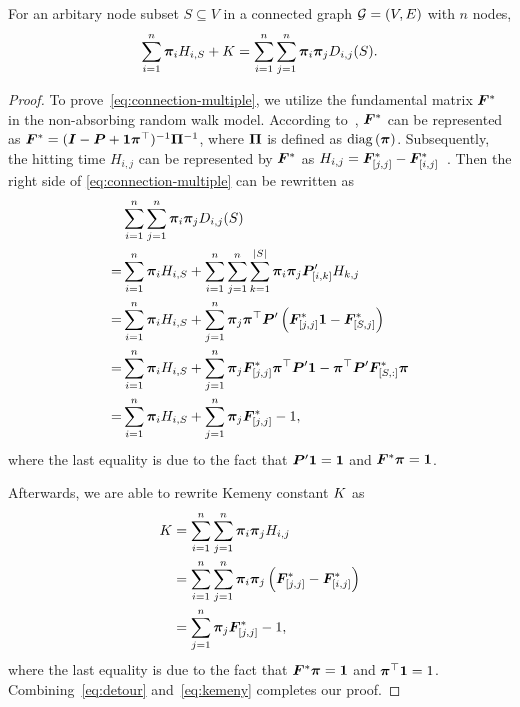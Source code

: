 \documentclass[sigconf]{acmart}
\begin{document}
\begin{theorem}\label{thm:connection-multiple}
    For an arbitary node subset \(S\subseteq V\) in a connected graph \(\mathcal{G}=(V,E)\) with \(n\) nodes,
    \begin{equation}\label{eq:connection-multiple}
        \sum_{i=1}^n\boldsymbol{\pi}_iH_{i,S}+K=\sum_{i=1}^n\sum_{j=1}^n\boldsymbol{\pi}_i\boldsymbol{\pi}_jD_{i,j}(S).
    \end{equation}
\end{theorem}
\begin{proof}
    To prove~\eqref{eq:connection-multiple}, we utilize the fundamental matrix \(\boldsymbol{F}^*\) in the non-absorbing random walk model.
    According to~\cite{BoRaZh11}, \(\boldsymbol{F}^*\) can be represented as \(\boldsymbol{F}^*=(\boldsymbol{I}-\boldsymbol{P}+\boldsymbol{1}\boldsymbol{\pi}^\top)^{-1}\boldsymbol{\Pi}^{-1}\), where \(\boldsymbol{\Pi}\) is defined as \(\rm{diag}\left( \boldsymbol{\pi} \right)\).
    Subsequently, the hitting time \(H_{i,j}\) can be represented by \(\boldsymbol{F}^*\) as \(H_{i,j}=\boldsymbol{F}^*_{[j,j]}-\boldsymbol{F}^*_{[i,j]}\)~\cite{BoRaZh11}.
    Then the right side of \eqref{eq:connection-multiple} can be rewritten as
    \begin{equation}\label{eq:detour}
        \begin{split}
            &\sum_{i=1}^n\sum_{j=1}^n\boldsymbol{\pi}_i\boldsymbol{\pi}_jD_{i,j}(S)\\
            =&\sum_{i=1}^n\boldsymbol{\pi}_i H_{i,S}+\sum_{i=1}^n\sum_{j=1}^n\sum_{k=1}^{\left|S \right|}\boldsymbol{\pi}_i\boldsymbol{\pi}_j\boldsymbol{P}'_{[i,k]}H_{k,j}  \\
            =&\sum_{i=1}^n\boldsymbol{\pi}_i H_{i,S}+\sum_{j=1}^n\boldsymbol{\pi}_j\boldsymbol{\pi}^\top\boldsymbol{P}'\left( \boldsymbol{F}^*_{[j,j]}\boldsymbol{1}-\boldsymbol{F}^*_{[S,j]} \right)                        \\
            =&\sum_{i=1}^n\boldsymbol{\pi}_i H_{i,S}+\sum_{j=1}^n\boldsymbol{\pi}_j\boldsymbol{F}^*_{[j,j]}\boldsymbol{\pi}^\top\boldsymbol{P}'\boldsymbol{1}-\boldsymbol{\pi}^\top\boldsymbol{P}'\boldsymbol{F}^*_{[S,:]}\boldsymbol{\pi} \\
            =&\sum_{i=1}^n\boldsymbol{\pi}_i H_{i,S}+\sum_{j=1}^n\boldsymbol{\pi}_j\boldsymbol{F}^*_{[j,j]}-1,
        \end{split}
    \end{equation}
    where the last equality is due to the fact that \(\boldsymbol{P}'\boldsymbol{1}=\boldsymbol{1}\) and \(\boldsymbol{F}^*\boldsymbol{\pi}=\boldsymbol{1}\).

    Afterwards, we are able to rewrite Kemeny constant \(K\) as
    \begin{equation}\label{eq:kemeny}
        \begin{split}
            K&=\sum_{i=1}^n\sum_{j=1}^n\boldsymbol{\pi}_i\boldsymbol{\pi}_jH_{i,j}\\
            &=\sum_{i=1}^n\sum_{j=1}^n\boldsymbol{\pi}_i\boldsymbol{\pi}_j\left( \boldsymbol{F}^*_{[j,j]}-\boldsymbol{F}^*_{[i,j]} \right)\\
            &=\sum_{j=1}^n\boldsymbol{\pi}_j\boldsymbol{F}^*_{[j,j]}-1,
        \end{split}
    \end{equation}
    where the last equality is due to the fact that \(\boldsymbol{F}^*\boldsymbol{\pi}=\boldsymbol{1}\) and \(\boldsymbol{\pi}^\top\boldsymbol{1}=1\).
    Combining~\eqref{eq:detour} and~\eqref{eq:kemeny} completes our proof.
\end{proof}
\end{document}
